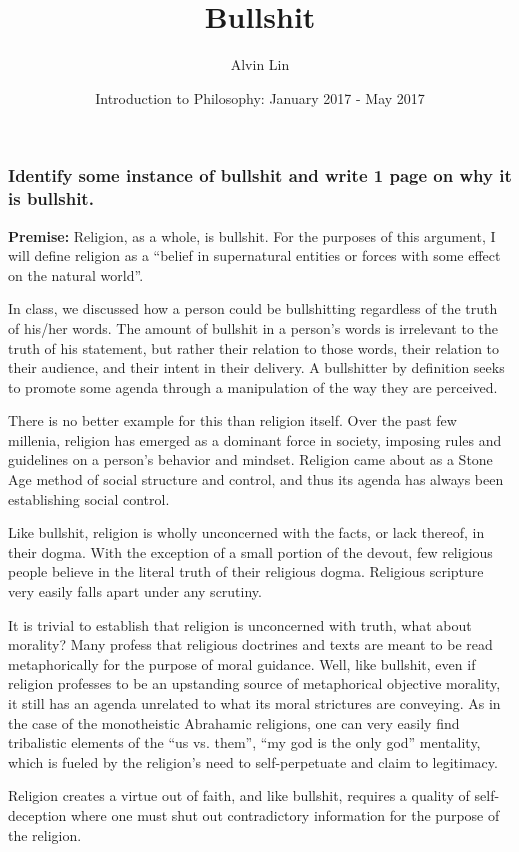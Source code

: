 \documentclass{article}
\title{Bullshit}
\author{Alvin Lin}
\date{Introduction to Philosophy: January 2017 - May 2017}
\begin{document}
\maketitle

\subsubsection*{Identify some instance of bullshit and write 1 page on why it
is bullshit.}

\textbf{Premise:} Religion, as a whole, is bullshit. For the purposes of this
argument, I will define religion as a ``belief in supernatural entities or
forces with some effect on the natural world''.

In class, we discussed how a person could be bullshitting regardless of the
truth of his/her words. The amount of bullshit in a person's words is irrelevant
to the truth of his statement, but rather their relation to those words, their
relation to their audience, and their intent in their delivery. A bullshitter
by definition seeks to promote some agenda through a manipulation of the
way they are perceived. \par
There is no better example for this than religion itself. Over the past few
millenia, religion has emerged as a dominant force in society, imposing rules
and guidelines on a person's behavior and mindset. Religion came about as a
Stone Age method of social structure and control, and thus its agenda has
always been establishing social control. \par
Like bullshit, religion is wholly unconcerned with the facts, or lack
thereof, in their dogma. With the exception of a small portion of the devout,
few religious people believe in the literal truth of their religious dogma.
Religious scripture very easily falls apart under any scrutiny. \par
It is trivial to establish that religion is unconcerned with truth, what about
morality? Many profess that religious doctrines and texts are meant to be read
metaphorically for the purpose of moral guidance. Well, like bullshit, even if
religion professes to be an upstanding source of metaphorical objective
morality, it still has an agenda unrelated to what its moral strictures are
conveying. As in the case of the monotheistic Abrahamic religions, one can very
easily find tribalistic elements of the ``us vs. them'', ``my god is the only
god'' mentality, which is fueled by the religion's need to self-perpetuate and
claim to legitimacy. \par
Religion creates a virtue out of faith, and like bullshit, requires a quality
of self-deception where one must shut out contradictory information for the
purpose of the religion.
\end{document}
